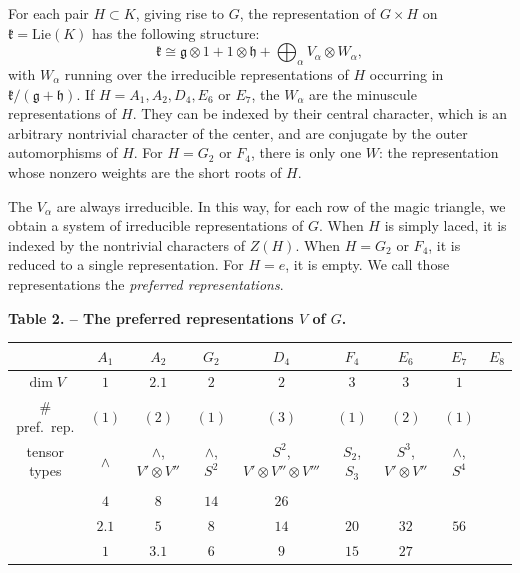 \documentclass[11pt,a4paper]{article}
\begin{document}
For each pair $H \subset K$, giving rise to $G$, the representation of $G \times H$ on $\mathfrak{k} = \mathrm{Lie}(K)$ has the following structure:
\begin{equation*}
\mathfrak{k} \cong \mathfrak{g} \otimes 1 + 1 \otimes \mathfrak{h} + \bigoplus_{\alpha} V_{\alpha} \otimes W_{\alpha},
\end{equation*}
with $W_{\alpha}$ running over the irreducible representations of $H$ occurring in $\mathfrak{k}/(\mathfrak{g} + \mathfrak{h})$. If $H = A_{1}, A_{2}, D_{4}, E_{6}$ or $E_{7}$, the $W_{\alpha}$ are the minuscule representations of $H$. They can be indexed by their central character, which is an arbitrary nontrivial character of the center, and are conjugate by the outer automorphisms of $H$. For $H = G_{2}$ or $F_{4}$, there is only one $W$: the representation whose nonzero weights are the short roots of $H$.

The $V_{\alpha}$ are always irreducible. In this way, for each row of the magic triangle, we obtain a system of irreducible representations of $G$. When $H$ is simply laced, it is indexed by the nontrivial characters of $Z(H)$. When $H = G_{2}$ or $F_{4}$, it is reduced to a single representation. For $H = e$, it is empty. We call those representations the \emph{preferred representations}.

\begin{center}
\textbf{Table 2. -- The preferred representations $V$ of $G$.}
\end{center}

\begin{center}
\small
\begin{tabular}{ccccccccc}
\toprule
& $A_{1}$ & $A_{2}$ & $G_{2}$ & $D_{4}$ & $F_{4}$ & $E_{6}$ & $E_{7}$ & $E_{8}$ \\
\midrule
$\dim V$ & $1$ & $2.1$ & $2$ & $2$ & $3$ & $3$ & $1$ & \\
$\#$ pref.~rep. & $(1)$ & $(2)$ & $(1)$ & $(3)$ & $(1)$ & $(2)$ & $(1)$ & \\
tensor types & $\wedge$ & $\wedge$, $V' \otimes V''$ & $\wedge$, $S^{2}$ & $S^{2}$, $V' \otimes V'' \otimes V'''$ & $S_{2}$, $S_{3}$ & $S^{3}$, $V' \otimes V''$ & $\wedge$, $S^{4}$ & \\
\midrule
& & & & & & & & \\
& $4$ & $8$ & $14$ & $26$ & & & & \\
& $2.1$ & $5$ & $8$ & $14$ & $20$ & $32$ & $56$ & \\
& $1$ & $3.1$ & $6$ & $9$ & $15$ & $27$ & & \\
\bottomrule
\end{tabular}
\end{center}
\end{document}
